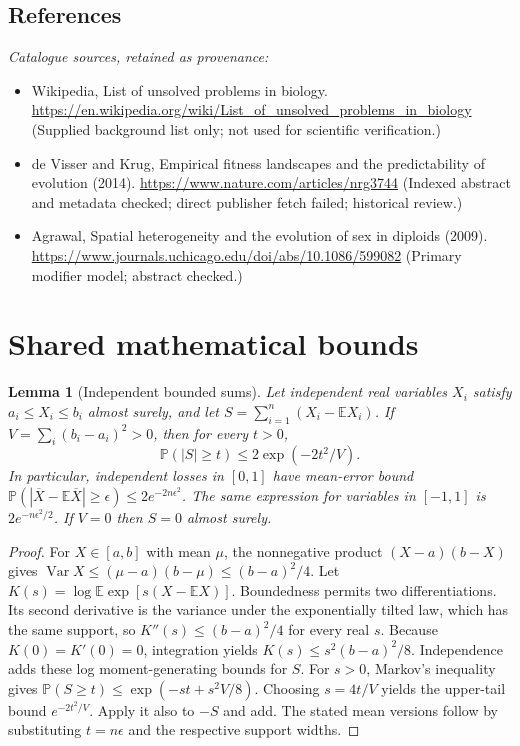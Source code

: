 \documentclass[11pt]{article}
\newcommand{\E}{\mathbb E}
\newcommand{\Prob}{\mathbb P}
\DeclareMathOperator{\Var}{Var}
\providecommand{\E}{\mathbb E}
\providecommand{\Prob}{\mathbb P}
\providecommand{\Var}{\operatorname{Var}}
\newtheorem{sharedlemma}{Lemma}[section]
\begin{document}
\subsection{References}
\noindent\emph{Catalogue sources, retained as provenance:}
\begin{itemize}
\item Wikipedia, List of unsolved problems in biology. \url{https://en.wikipedia.org/wiki/List_of_unsolved_problems_in_biology} (Supplied background list only; not used for scientific verification.)
\item de Visser and Krug, Empirical fitness landscapes and the predictability of evolution (2014). \url{https://www.nature.com/articles/nrg3744} (Indexed abstract and metadata checked; direct publisher fetch failed; historical review.)
\item Agrawal, Spatial heterogeneity and the evolution of sex in diploids (2009). \url{https://www.journals.uchicago.edu/doi/abs/10.1086/599082} (Primary modifier model; abstract checked.)
\end{itemize}
\clearpage


\appendix
\section{Shared mathematical bounds}\label{app:bounds}
\begin{sharedlemma}[Independent bounded sums]\label{lem:bounded}
Let independent real variables $X_i$ satisfy $a_i\leq X_i\leq b_i$ almost surely,
and let $S=\sum_{i=1}^n(X_i-\E X_i)$. If
$V=\sum_i(b_i-a_i)^2>0$, then for every $t>0$,
\[
 \Prob(|S|\geq t)\leq 2\exp(-2t^2/V).
\]
In particular, independent losses in $[0,1]$ have mean-error bound
$\Prob(|\overline X-\E\overline X|\geq\epsilon)
\leq2e^{-2n\epsilon^2}$. The same expression for variables in $[-1,1]$
is $2e^{-n\epsilon^2/2}$. If $V=0$ then $S=0$ almost surely.
\end{sharedlemma}
\begin{proof}
For $X\in[a,b]$ with mean $\mu$, the nonnegative product
$(X-a)(b-X)$ gives
$\Var X\leq(\mu-a)(b-\mu)\leq(b-a)^2/4$.
Let $K(s)=\log\E\exp[s(X-\E X)]$.
Boundedness permits two differentiations. Its second derivative is the variance
under the exponentially tilted law, which has the same support, so
$K''(s)\leq(b-a)^2/4$ for every real $s$.
Because $K(0)=K'(0)=0$, integration yields
$K(s)\leq s^2(b-a)^2/8$.
Independence adds these log moment-generating bounds for $S$.
For $s>0$, Markov's inequality gives
$\Prob(S\geq t)\leq\exp(-st+s^2V/8)$.
Choosing $s=4t/V$ yields the upper-tail bound $e^{-2t^2/V}$.
Apply it also to $-S$ and add. The stated mean versions follow by substituting
$t=n\epsilon$ and the respective support widths.
\end{proof}
\end{document}
